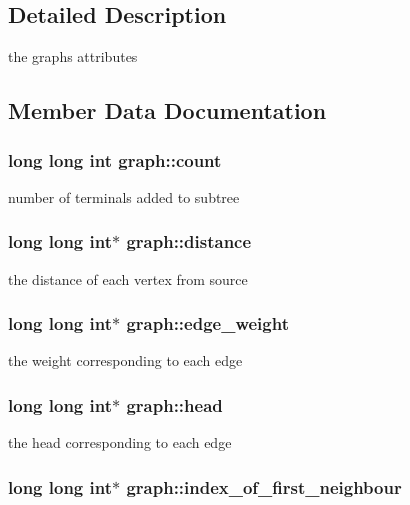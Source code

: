 \subsection{Detailed Description}
the graphs attributes 

\subsection{Member Data Documentation}
\hypertarget{structgraph_a55accd4efc16514596b2831432af4d61}{
\subsubsection[{count}]{\setlength{\rightskip}{0pt plus 5cm}long long int graph\+::count}}\label{structgraph_a55accd4efc16514596b2831432af4d61}
number of terminals added to subtree \hypertarget{structgraph_a8e320079bdfaaa5c0cd5919255ba1eea}{
\subsubsection[{distance}]{\setlength{\rightskip}{0pt plus 5cm}long long int$\ast$ graph\+::distance}}\label{structgraph_a8e320079bdfaaa5c0cd5919255ba1eea}
the distance of each vertex from source \hypertarget{structgraph_a5707a41a1120640570bdaf3d0c38d750}{
\subsubsection[{edge\+\_\+weight}]{\setlength{\rightskip}{0pt plus 5cm}long long int$\ast$ graph\+::edge\+\_\+weight}}\label{structgraph_a5707a41a1120640570bdaf3d0c38d750}
the weight corresponding to each edge \hypertarget{structgraph_a41bbb7c4402ab2357a1e1b5ab7f2fd4c}{
\subsubsection[{head}]{\setlength{\rightskip}{0pt plus 5cm}long long int$\ast$ graph\+::head}}\label{structgraph_a41bbb7c4402ab2357a1e1b5ab7f2fd4c}
the head corresponding to each edge \hypertarget{structgraph_afbce9206febb697c7a6e18cdd87fba89}{
\subsubsection[{index\+\_\+of\+\_\+first\+\_\+neighbour}]{\setlength{\rightskip}{0pt plus 5cm}long long int$\ast$ graph\+::index\+\_\+of\+\_\+first\+\_\+neighbour}}\label{structgraph_afbce9206febb697c7a6e18cdd87fba89}
